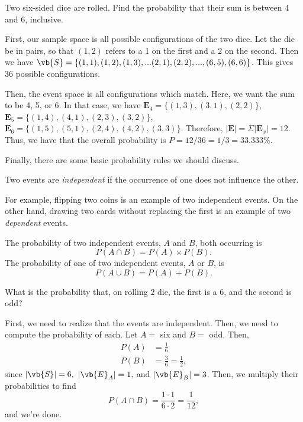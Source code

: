 \documentclass[11pt]{article}
\begin{document}
\begin{example}
    Two six-sided dice are rolled. Find the probability that their sum is between 4 and 6, inclusive.
\end{example}
\begin{solution}
    First, our sample space is all possible configurations of the two dice. Let the die be in pairs, so that $(1,2)$ refers to a 1 on the first and a $2$ on the second. Then we have $\vb{S} = \{(1,1), (1,2), (1,3),...(2,1),(2,2),..., (6,5), (6,6)\}$. This gives $36$ possible configurations.
    
    Then, the event space is all configurations which match. Here, we want the sum to be 4, 5, or 6. In that case, we have $\mathbf{E}_4 = \{(1,3), (3,1), (2,2)\}$, $\mathbf{E}_5 = \{(1,4), (4,1), (2,3), (3,2)\}$, $\mathbf{E}_6 = \{(1,5), (5,1), (2,4), (4,2), (3, 3)\}$. Therefore, $|\mathbf{E}| = \Sigma |\mathbf{E}_x| = 12$. Thus, we have that the overall probability is $P = 12/36 = 1/3 = 33.333\%$.
\end{solution}

\noindent Finally, there are some basic probability rules we should discuss.

\begin{defn}
    Two events are \textit{independent} if the occurrence of one does not influence the other.
\end{defn}

For example, flipping two coins is an example of two independent events. On the other hand, drawing two cards without replacing the first is an example of two \textit{dependent} events.

\begin{thrm}
    The probability of two independent events, $A$ and $B$, both occurring is
    \[P(A \cap B) = P(A)\times P(B).\]
    The probability of one of two independent events, $A$ or $B$, is
    \[P(A \cup B) = P(A) + P(B).\]
\end{thrm}
\begin{example}
    What is the probability that, on rolling $2$ die, the first is a 6, and the second is odd?
\end{example}
\begin{solution}
    First, we need to realize that the events are independent. Then, we need to compute the probability of each. Let $A =$ six and $B =$ odd. Then,
    \begin{align*}
        P(A) &= \frac{1}{6} \\
        P(B) &= \frac{3}{6} = \frac{1}{2},
    \end{align*}
    since $|\vb{S}| = 6,$ $|\vb{E}_A| = 1,$ and $|\vb{E}_B| = 3$. Then, we multiply their probabilities to find
    \[P(A \cap B) = \frac{1 \cdot 1}{6 \cdot 2} = \boxed{\frac{1}{12}},\]
    and we're done.
\end{solution}
\end{document}
